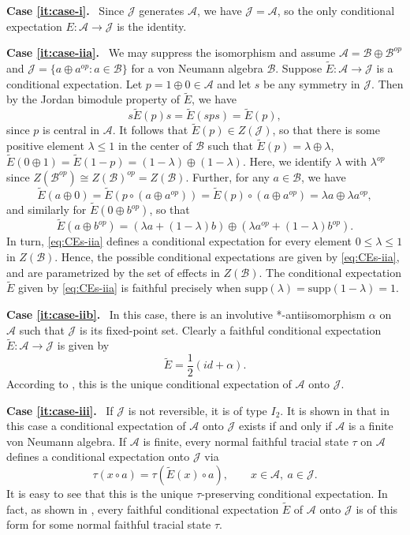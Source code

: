 \documentclass[12pt]{article}
\def\Je{\mathcal J}
\def\Be{\mathcal B}
\def\Ae{\mathcal A}
\def\supp{\mathrm{supp}}
\theoremstyle{definition}
\theoremstyle{remark}
\begin{document}
\textbf{Case \ref{it:case-i}.}~
Since $\Je$ generates $\Ae$, we have $\Je=\Ae$, so the only conditional expectation $E:\Ae\to\Je$ is the identity.

\textbf{Case \ref{it:case-iia}.}~
We may suppress the isomorphism and assume $\Ae = \Be\oplus \Be^{op}$ and $\Je = \{a\oplus a^{op} : a\in \Be\}$ for a von Neumann algebra $\Be$.
Suppose $\tilde E:\Ae\to \Je$ is a conditional expectation.
Let $p=1\oplus 0\in \Ae$ and let $s$ be any symmetry in $\Je$. 
Then by the Jordan bimodule property of
$\tilde E$, we have
\[
s\tilde E(p)s=\tilde E(sps)=\tilde E(p),
\]
since $p$ is central in $\Ae$. It follows that $\tilde E(p)\in Z(\Je)$, so that there is
some positive element $\lambda\le 1$ in the center of $\Be$ such that $\tilde
E(p)=\lambda\oplus\lambda$, $\tilde E(0\oplus 1)=\tilde E(1-p)=(1-\lambda)\oplus
(1-\lambda)$. 
{Here, we identify $\lambda$ with $\lambda^{op}$ since $Z(\Be^{op})\cong Z(\Be)^{op} = Z(\Be)$.}
Further, for any $a\in \Be$, we have
\[
\tilde E(a\oplus 0)=\tilde E(p\circ (a\oplus a^{op}))=\tilde E(p)\circ (a\oplus a^{op})=\lambda
a\oplus \lambda a^{op},
\]
and similarly for $\tilde E(0\oplus b^{op})$, so that
\begin{equation}\label{eq:CEs-iia}
    \tilde E(a\oplus b^{op})=(\lambda a+(1-\lambda)b)\oplus (\lambda a^{op}+(1-\lambda)b^{op}).
\end{equation}
In turn, \eqref{eq:CEs-iia} defines a conditional expectation for every element $0\le \lambda\le 1$ in $Z(\Be)$.
Hence, the possible conditional expectations are given by \eqref{eq:CEs-iia}, and are parametrized by the set of effects in $Z(\Be)$. 
The conditional expectation $\tilde E$ given by \eqref{eq:CEs-iia} is faithful precisely when $\supp(\lambda) = \supp(1-\lambda)=1$.


\textbf{Case \ref{it:case-iib}.}~
In this case, there is an involutive *-antiisomorphism $\alpha$ on $\Ae$ such that $\Je$ is its fixed-point set.
Clearly a faithful conditional expectation 
$\tilde E:\Ae \to \Je$ is given by
\[
\tilde E=\frac12(id+ \alpha).
\]
According to \cite[Theorem 3.2]{haagerup1995positive}, this is the unique conditional expectation of $\Ae$ onto $\Je$.

\textbf{Case \ref{it:case-iii}.}~ 
If $\Je$ is not reversible, it is of type $I_2$. It is shown in
\cite[Thm.~2.1]{haagerup1995positive} that in this case a conditional expectation of $\Ae$ onto $\Je$ exists if and only if $\Ae$ is a finite von Neumann algebra.
If $\Ae$ is finite, every normal faithful tracial state $\tau$ on $\Ae$ defines a
conditional expectation onto $\Je$ via
\begin{equation}\label{eq:tracial}
    \tau(x\circ a)= \tau(\tilde E(x)\circ a),
    \qquad x\in \Ae,\  a\in \Je.
\end{equation}
It is easy to see that this is the unique $\tau$-preserving conditional expectation.
In fact, as shown in \cite{haagerup1995positive}, every faithful conditional expectation $\tilde E$ of $\Ae$ onto $\Je$ is of this form for some normal faithful tracial state $\tau$.
\end{document}
